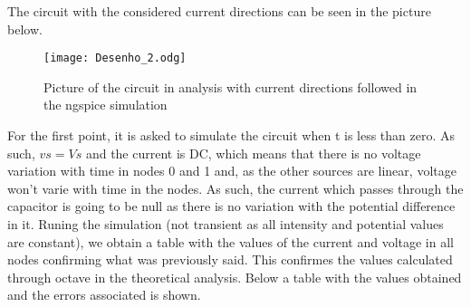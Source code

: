 \par The circuit with the considered current directions can be seen in the picture below.

\begin{figure}[h] \centering
\texttt{[image: Desenho\_2.odg]}
\caption{Picture of the circuit in analysis with current directions followed in the ngspice simulation}
\label{fig:Ngspice circuit}
\end{figure}

\par For the first point, it is asked to simulate the circuit when t is less than zero. As such, $vs=Vs$ and the current is DC, which means that there is no voltage variation with time in nodes 0 and 1 and, as the other sources are linear, voltage won't varie with time in the nodes. As such, the current which passes through the capacitor is going to be null as there is no variation with the potential difference in it. Runing the simulation (not transient as all intensity and potential values are constant), we obtain a table with the values of the current and voltage in all nodes confirming what was previously said. This confirmes the values calculated through octave in the theoretical analysis. Below a table with the values obtained and the errors associated is shown.

\vspace{5mm}
\begin{table}[H]
\centering
\begin{tabularx}{0.6\textwidth} {
  | >{\raggedright\arraybackslash}X
  | >{\raggedleft\arraybackslash}X | }
 \hline

\end{tabularx}
\end{table}
\vspace{5mm}

